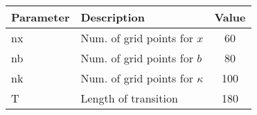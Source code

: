 \begin{tabular}{llc} \hline 
 Parameter & Description & Value \\ 
 \hline 
nx  & Num. of grid points for $x$       & 60 \\ 
nb  & Num. of grid points for $b$       & 80 \\ 
nk  & Num. of grid points for $\kappa$  & 100 \\ 
T   & Length of transition              & 180 \\ 
\hline 
 \end{tabular} 
